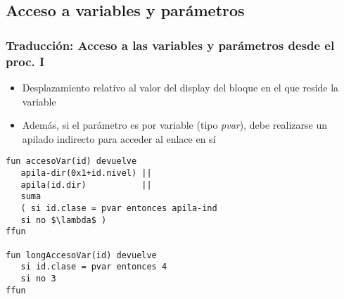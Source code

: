 \documentclass[hyperref={pdfpagelabels=false},tree-dvips,compress]{beamer}
\begin{document}
\subsection{Acceso a variables y parámetros}
\begin{frame}[fragile]
\frametitle{Traducción: Acceso a las variables y parámetros desde el proc. I}

\begin{itemize}
	\item Desplazamiento relativo al valor del display del bloque en el que reside la variable
	\item Además, si el parámetro es por variable (tipo \emph{pvar}), debe realizarse un apilado indirecto para acceder al enlace en sí
\end{itemize}

\begin{lstlisting}[style=codigoMP,basicstyle=\footnotesize\ttfamily,mathescape]
fun accesoVar(id) devuelve
   apila-dir(0x1+id.nivel) ||
   apila(id.dir)           ||
   suma
   ( si id.clase = pvar entonces apila-ind
   si no $\lambda$ )
ffun

fun longAccesoVar(id) devuelve
   si id.clase = pvar entonces 4
   si no 3
ffun
\end{lstlisting}

\end{frame}
\end{document}
